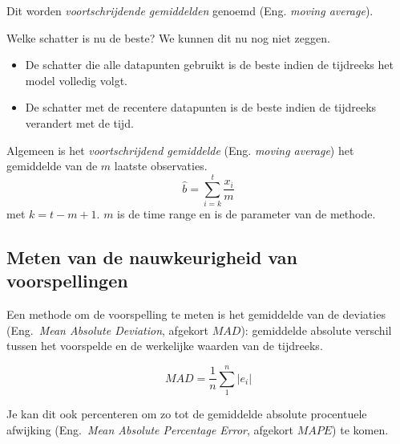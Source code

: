 Dit worden \textit{voortschrijdende gemiddelden} genoemd (Eng. \emph{moving average}). 

Welke schatter is nu de beste? We kunnen dit nu nog niet zeggen.

\begin{itemize}
\item De schatter die alle datapunten gebruikt is de beste indien de tijdreeks het model volledig volgt.
\item De schatter met de recentere datapunten is de beste indien de tijdreeks verandert met de tijd.
\end{itemize}

\begin{definition}
Algemeen is het \emph{voortschrijdend gemiddelde} (Eng. \emph{moving average}) het gemiddelde van de $m$ laatste observaties.
\begin{equation}
	\widehat{b} = \sum_{i=k}^{t} \frac{x_{i}}{m}
\label{eq:movingAverage}
\end{equation}
met $k = t-m+1$. $m$ is de time range en is de parameter van de methode.
\end{definition}

\subsection{Meten van de nauwkeurigheid van voorspellingen}

%

Een methode om de voorspelling te meten is het gemiddelde van de deviaties (Eng.~\emph{Mean Absolute Deviation}, afgekort $MAD$): gemiddelde absolute verschil tussen het voorspelde en de werkelijke waarden van de tijdreeks.

\begin{definition}[$MAD$]
\begin{equation}
	MAD = \frac{1}{n} \sum_{1}^{n} \left| e_{i} \right|  
\label{eq:MAD}
\end{equation}
\end{definition}

Je kan dit ook percenteren om zo tot de gemiddelde absolute procentuele afwijking (Eng.~\emph{Mean Absolute Percentage Error}, afgekort $MAPE$) te komen.

